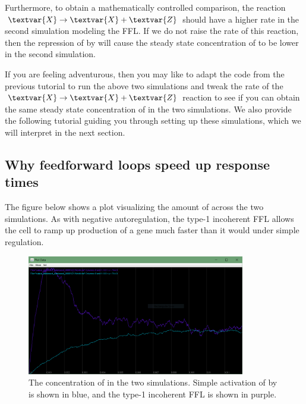 Furthermore, to obtain a mathematically controlled comparison, the reaction $\textvar{X} \rightarrow \textvar{X} + \textvar{Z}$ should have a higher rate in the second simulation modeling the FFL. If we do not raise the rate of this reaction, then the repression of  by  will cause the steady state concentration of  to be lower in the second simulation.

If you are feeling adventurous, then you may like to adapt the code from the previous tutorial to run the above two simulations and tweak the rate of the $\textvar{X} \rightarrow \textvar{X} + \textvar{Z}$ reaction to see if you can obtain the same steady state concentration of  in the two simulations. We also provide the following tutorial guiding you through setting up these simulations, which we will interpret in the next section.


\FloatBarrier
{}
\subsection{Why feedforward loops speed up response times}

The figure below shows a plot visualizing the amount of  across the two simulations. As with negative autoregulation, the type-1 incoherent FFL allows the cell to ramp up production of a gene  much faster than it would under simple regulation.\\

\begin{figure}[h]
\centering
\mySfFamily
\includegraphics[width = 0.85\textwidth]{../images/ffl_chart.png}
\caption{The concentration of  in the two simulations. Simple activation of  by  is shown in blue, and the type-1 incoherent FFL is shown in purple.}
\label{fig:ffl_chart}
\end{figure}

